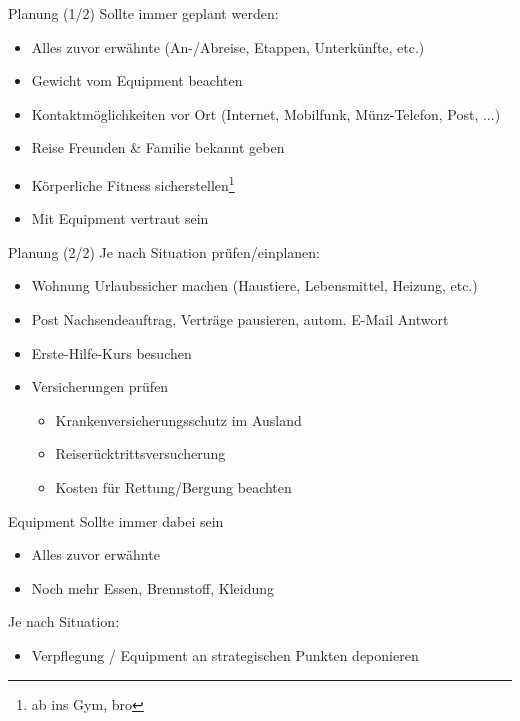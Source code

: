 \documentclass[aspectratio=169]{beamer}
\begin{document}
			\begin{frame}{Planung (1/2)}
				Sollte immer geplant werden:
				\begin{itemize}
					\item Alles zuvor erwähnte (An-/Abreise, Etappen, Unterkünfte, etc.)
					\item Gewicht vom Equipment beachten
					\item Kontaktmöglichkeiten vor Ort (Internet, Mobilfunk, Münz-Telefon, Post, ...)
					\item Reise Freunden \& Familie bekannt geben
					\item Körperliche Fitness sicherstellen\footnote{ab ins Gym, bro}
					\item Mit Equipment vertraut sein
				\end{itemize}
			\end{frame}
				
			\begin{frame}{Planung (2/2)}
				Je nach Situation prüfen/einplanen:
				\begin{itemize}
					\item Wohnung Urlaubssicher machen (Haustiere, Lebensmittel, Heizung, etc.)
					\item Post Nachsendeauftrag, Verträge pausieren, autom. E-Mail Antwort
					\item Erste-Hilfe-Kurs besuchen
					\item Versicherungen prüfen
					\begin{itemize}
						\item Krankenversicherungsschutz im Ausland
						\item Reiserücktrittsversucherung
						\item Kosten für Rettung/Bergung beachten
					\end{itemize}
				\end{itemize}
			\end{frame}
			
			\begin{frame}{Equipment}
				Sollte immer dabei sein
				\begin{itemize}
					\item Alles zuvor erwähnte
					\item Noch mehr Essen, Brennstoff, Kleidung
				\end{itemize}
				Je nach Situation:
				\begin{itemize}
					\item Verpflegung / Equipment an strategischen Punkten deponieren
				\end{itemize}
			\end{frame}
	
\end{document}
